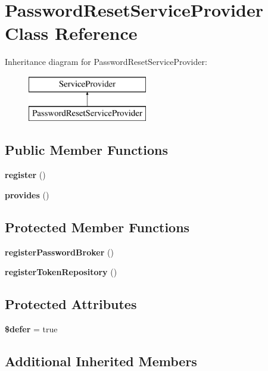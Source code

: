 \section{Password\+Reset\+Service\+Provider Class Reference}
\label{class_illuminate_1_1_auth_1_1_passwords_1_1_password_reset_service_provider}
Inheritance diagram for Password\+Reset\+Service\+Provider\+:\begin{figure}[H]
\begin{center}
\leavevmode
\includegraphics[height=2.000000cm]{class_illuminate_1_1_auth_1_1_passwords_1_1_password_reset_service_provider}
\end{center}
\end{figure}
\subsection*{Public Member Functions}
\begin{DoxyCompactItemize}
\item 
{\bf register} ()
\item 
{\bf provides} ()
\end{DoxyCompactItemize}
\subsection*{Protected Member Functions}
\begin{DoxyCompactItemize}
\item 
{\bf register\+Password\+Broker} ()
\item 
{\bf register\+Token\+Repository} ()
\end{DoxyCompactItemize}
\subsection*{Protected Attributes}
\begin{DoxyCompactItemize}
\item 
{\bf \$defer} = true
\end{DoxyCompactItemize}
\subsection*{Additional Inherited Members}


